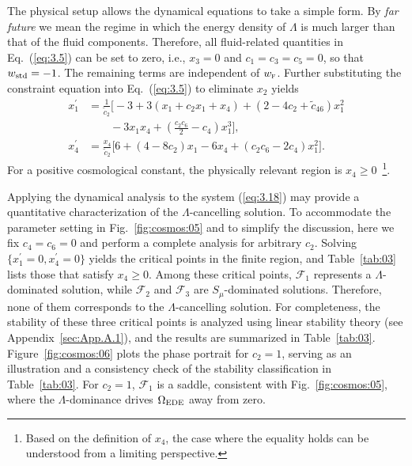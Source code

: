 \documentclass[aps,prd,twocolumn]{revtex4-2}
\newcommand\subEDE{{\rm EDE}}
\newcommand\subF{\textsc{f}}
\newcommand\substd{{\rm std}}
\begin{document}
The physical setup allows the dynamical equations to take a simple form. By \textit{far future} we mean the regime in which the energy density of $\Lambda$ is much larger than that of the fluid components. Therefore, all fluid-related quantities in Eq.~(\ref{eq:3.5}) can be set to zero, i.e., $x_3=0$ and $c_1=c_3=c_5=0$, so that $w_\substd=-1$. The remaining terms are independent of $w_\subF$. Further substituting the constraint equation into Eq.~(\ref{eq:3.5}) to eliminate $x_2$ yields
\begin{subequations}\label{eq:3.18}
\begin{align}
  x_1^\prime &= \frac{1}{\tilde{c}_2} \Big[-3 + 3(x_1+c_2x_1+x_4) + (2-4c_2+\tilde{c}_{46})x_1^2 \nonumber\\
    &\qquad - 3x_1x_4 + (\frac{c_2c_6}{2}-c_4)x_1^3\Big], \\
  x_4^\prime &= \frac{x_4}{\tilde{c}_2} \Big[6 + (4-8c_2)x_1 - 6x_4 + (c_2c_6-2c_4)x_1^2\Big].
\end{align}
\end{subequations}
For a positive cosmological constant, the physically relevant region is $x_4\geqslant0$~\footnote{Based on the definition of $x_4$, the case where the equality holds can be understood from a limiting perspective.}.

Applying the dynamical analysis to the system (\ref{eq:3.18}) may provide a quantitative characterization of the $\Lambda$-cancelling solution. To accommodate the parameter setting in Fig.~\ref{fig:cosmos:05} and to simplify the discussion, here we fix $c_4=c_6=0$ and perform a complete analysis for arbitrary $c_2$. Solving $\{x_1^\prime=0,x_4^\prime=0\}$ yields the critical points in the finite region, and Table~\ref{tab:03} lists those that satisfy $x_4\geqslant0$. Among these critical points, $\mathcal{F}_1$ represents a $\Lambda$-dominated solution, while $\mathcal{F}_2$ and $\mathcal{F}_3$ are $S_\mu$-dominated solutions. Therefore, none of them corresponds to the $\Lambda$-cancelling solution. For completeness, the stability of these three critical points is analyzed using linear stability theory (see Appendix~\ref{sec:App.A.1}), and the results are summarized in Table~\ref{tab:03}. Figure~\ref{fig:cosmos:06} plots the phase portrait for $c_2=1$, serving as an illustration and a consistency check of the stability classification in Table~\ref{tab:03}. For $c_2=1$, $\mathcal{F}_1$ is a saddle, consistent with Fig.~\ref{fig:cosmos:05}, where the $\Lambda$-dominance drives $\Omega_\subEDE$ away from zero.
\end{document}
